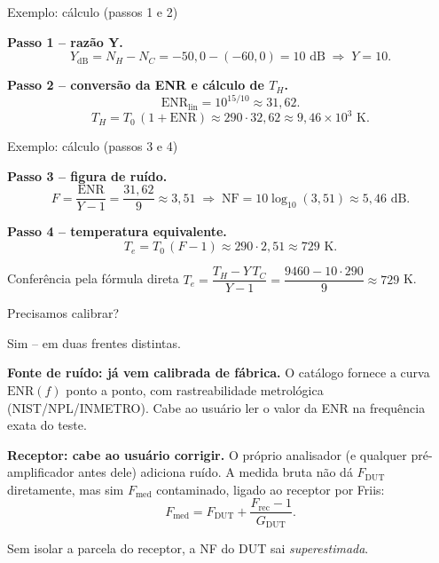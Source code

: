 
\begin{frame}{Exemplo: cálculo (passos 1 e 2)}

\textbf{Passo 1 -- razão Y.}
\[
Y_{\text{dB}} = N_H - N_C = -50{,}0 - (-60{,}0) = 10 \text{ dB} \;\Rightarrow\; Y = 10.
\]

\textbf{Passo 2 -- conversão da ENR e cálculo de $T_H$.}
\[
\text{ENR}_{\text{lin}} = 10^{15/10} \approx 31{,}62.
\]
\[
T_H = T_0\,(1 + \text{ENR}) \approx 290 \cdot 32{,}62 \approx 9{,}46 \times 10^3 \text{ K}.
\]

\end{frame}


\begin{frame}{Exemplo: cálculo (passos 3 e 4)}

\textbf{Passo 3 -- figura de ruído.}
\[
F = \frac{\text{ENR}}{Y - 1} = \frac{31{,}62}{9} \approx 3{,}51
\;\Rightarrow\;
\text{NF} = 10\log_{10}(3{,}51) \approx 5{,}46 \text{ dB}.
\]

\textbf{Passo 4 -- temperatura equivalente.}
\[
T_e = T_0\,(F - 1) \approx 290 \cdot 2{,}51 \approx 729 \text{ K}.
\]

\begin{block}{Conferência pela fórmula direta}
$T_e = \dfrac{T_H - Y\, T_C}{Y - 1} = \dfrac{9460 - 10 \cdot 290}{9} \approx 729$ K. \checkmark
\end{block}

\end{frame}


\begin{frame}{Precisamos calibrar?}

Sim -- em duas frentes distintas.

\textbf{Fonte de ruído: já vem calibrada de fábrica.} O catálogo fornece a curva $\text{ENR}(f)$ ponto a ponto, com rastreabilidade metrológica (NIST/NPL/INMETRO). Cabe ao usuário ler o valor da ENR na frequência exata do teste.

\textbf{Receptor: cabe ao usuário corrigir.} O próprio analisador (e qualquer pré-amplificador antes dele) adiciona ruído. A medida bruta não dá $F_{\text{DUT}}$ diretamente, mas sim $F_{\text{med}}$ contaminado, ligado ao receptor por Friis:
\[
F_{\text{med}} = F_{\text{DUT}} + \frac{F_{\text{rec}} - 1}{G_{\text{DUT}}}.
\]

Sem isolar a parcela do receptor, a NF do DUT sai \emph{superestimada}.

\end{frame}

